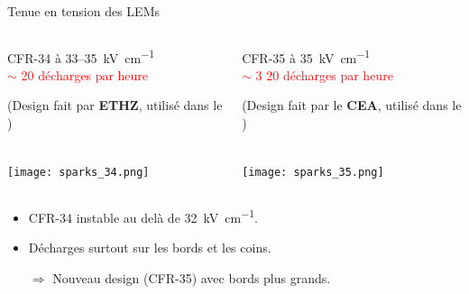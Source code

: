    \begin{frame}{Tenue en tension des LEMs}
   		\begin{columns}
    		\begin{column}{0.5\textwidth}
    			\begin{center}
	    			\begin{scriptsize}
		    			CFR-34 à 33--\SI{35}{\kilo\volt\per\centi\meter}\\
		    			\textcolor{red}{$\sim$ 20 décharges par heure}\\
		    		\end{scriptsize}
	    			\begin{tiny}
		    			(Design fait par \textbf{ETHZ}, utilisé dans le \TOO{})
		    		\end{tiny}\\
	    			\texttt{[image: sparks\_34.png]}
    			\end{center}
    		\end{column}\hfill
    		\begin{column}{0.5\textwidth}
    			\begin{center}
	    			\begin{scriptsize}
		    			CFR-35 à \SI{35}{\kilo\volt\per\centi\meter} \\
		    			\textcolor{red}{$\sim$ 3 20 décharges par heure}\\
		    		\end{scriptsize}
	    			\begin{tiny}
	    				(Design fait par le \textbf{CEA}, utilisé dans le \SSS{})
	   				\end{tiny}\\
	    			\texttt{[image: sparks\_35.png]}
	    		\end{center}
    		\end{column}
    	\end{columns}\vspace{0.1cm}
    	\begin{columns}
    		\begin{column}{0.5\textwidth}
    			\begin{scriptsize}
	    			\begin{itemize}
	    				\item CFR-34 instable au delà de \SI{32}{\kilo\volt\per\centi\meter}.
	    				\item Décharges surtout sur les bords et les coins.
	    			\end{itemize}
	    			\begin{itemize}
	    				\item[$\Rightarrow$] Nouveau design (CFR-35) avec bords plus grands.

\end{itemize}
\end{scriptsize}
\end{column}
\end{columns}
\end{frame}
